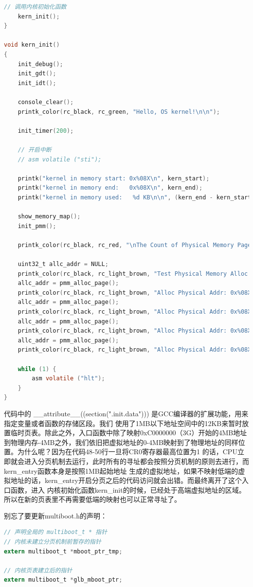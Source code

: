 \begin{lstlisting}[language = C, caption = init/entry.c]
	// 调用内核初始化函数
	kern_init();
}

void kern_init()
{
	init_debug();
	init_gdt();
	init_idt();

	console_clear();
	printk_color(rc_black, rc_green, "Hello, OS kernel!\n\n");

	init_timer(200);

	// 开启中断
	// asm volatile ("sti");

	printk("kernel in memory start: 0x%08X\n", kern_start);
	printk("kernel in memory end:   0x%08X\n", kern_end);
	printk("kernel in memory used:   %d KB\n\n", (kern_end - kern_start) / 1024);
	
	show_memory_map();
	init_pmm();

	printk_color(rc_black, rc_red, "\nThe Count of Physical Memory Page is: %u\n\n", phy_page_count);

	uint32_t allc_addr = NULL;
	printk_color(rc_black, rc_light_brown, "Test Physical Memory Alloc :\n");
	allc_addr = pmm_alloc_page();
	printk_color(rc_black, rc_light_brown, "Alloc Physical Addr: 0x%08X\n", allc_addr);
	allc_addr = pmm_alloc_page();
	printk_color(rc_black, rc_light_brown, "Alloc Physical Addr: 0x%08X\n", allc_addr);
	allc_addr = pmm_alloc_page();
	printk_color(rc_black, rc_light_brown, "Alloc Physical Addr: 0x%08X\n", allc_addr);
	allc_addr = pmm_alloc_page();
	printk_color(rc_black, rc_light_brown, "Alloc Physical Addr: 0x%08X\n", allc_addr);

	while (1) {
		asm volatile ("hlt");
	}
}
\end{lstlisting}

\par 代码中的 \_\_attribute\_\_((section(".init.data"))) 是GCC编译器的扩展功能，用来指定变量或者函数的存储区段。我们\allowbreak
使用了1MB以下地址空间中的12KB来暂时放置临时页表。除此之外，入口函数中除了映射0xC0000000（3G）开始的4MB地址到物理内存-4MB之外，我们依旧把虚拟地址的0-4MB映射到了物理地址的同样位置。为什么呢？因为在代码48-50行一旦将CR0寄存器最高位置为1\allowbreak
的话，CPU立即就会进入分页机制去运行，此时所有的寻址都会按照分页机制的原则去进行，而kern\_entry函数本身是按照1MB起始地址\allowbreak
生成的虚拟地址，如果不映射低端的虚拟地址的话，kern\_entry开启分页之后的代码访问就会出错。而最终离开了这个入口函数，进入\allowbreak
内核初始化函数kern\_init的时候，已经处于高端虚拟地址的区域。所以在新的页表里不再需要低端的映射也可以正常寻址了。

\par 别忘了要更新multiboot.h的声明：

\begin{lstlisting}[language = C, caption = include/multiboot.h]
// 声明全局的 multiboot_t * 指针
// 内核未建立分页机制前暂存的指针
extern multiboot_t *mboot_ptr_tmp;

// 内核页表建立后的指针
extern multiboot_t *glb_mboot_ptr;

\end{lstlisting}

